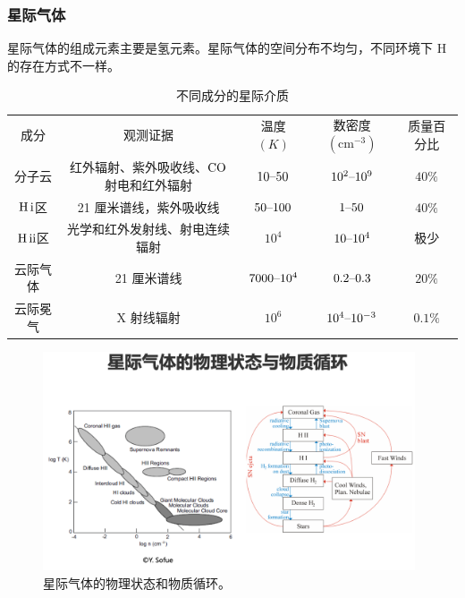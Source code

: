 \documentclass[../天体物理基础.tex]{subfiles}
\begin{document}
\subsubsection{星际气体}
星际气体的组成元素主要是氢元素。星际气体的空间分布不均匀，不同环境下 H 的存在方式不一样。
\begin{table}[!htbp]
\centering
\caption{不同成分的星际介质}
\begin{tabular}{c c c c c}
\hline
成分 & 观测证据 & 温度 $\left(\unit{K}\right)$ & 数密度$\left(\mathrm{cm^{-3}}\right)$ & 质量百分比\\
\cline{1-5}
分子云 & 红外辐射、紫外吸收线、$\ce{CO}$射电和红外辐射 & $10\text{\textendash}50$ & $10^{2}\text{\textendash}10^{9}$ & $40\%$\\
\cline{1-5}
$\ce{H}\,\mathrm{\uppercase\expandafter{\romannumeral1}}$区 & 21 厘米谱线，紫外吸收线 & $50\text{\textendash}100$ & $1\text{\textendash}50$ & $40\%$\\
\cline{1-5}
$\ce{H}\,\mathrm{\uppercase\expandafter{\romannumeral2}}$区 & 光学和红外发射线、射电连续辐射 & $10^{4}$ & $10\text{\textendash}10^{4}$ & 极少\\
\cline{1-5}
云际气体 & 21 厘米谱线 & $7000\text{\textendash}10^{4}$ & $0.2\text{\textendash}0.3$ & $20\%$\\
\cline{1-5}
云际冕气 & X 射线辐射 & $10^{6}$ & $10^{4}\text{\textendash}10^{-3}$ & $0.1\%$\\
\hline
\end{tabular}
\label{}
\end{table}

\begin{figure}[!htbp]
\centering
\includegraphics[width=11cm]{figures/figure3_1.png}
\captionsetup{justification=raggedright, singlelinecheck=false}
\caption{星际气体的物理状态和物质循环。}
\label{星际气体的物理状态和物质循环。}
\end{figure}
\end{document}
